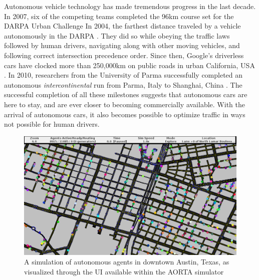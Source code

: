 \documentclass[letterpaper, 10 pt, conference]{ieeeconf}  %
\begin{document}
Autonomous vehicle technology has made tremendous progress in the last decade.
In 2007, six of the competing teams completed the 96km course set for the DARPA
Urban Challenge In 2004, the farthest distance traveled by a vehicle
autonomously in the DARPA \cite{spectrumUrbanChallenge2007}. They did so while
obeying the traffic laws followed by human drivers, navigating along with other
moving vehicles, and following correct intersection precedence order. Since
then, Google's driverless cars have clocked more than 250,000km on public roads
in urban California, USA \cite{tedThrun2011}. In 2010, researchers from the
University of Parma successfully completed an autonomous
\textit{intercontinental} run from Parma, Italy to Shanghai, China
\cite{cnnVislab2010}. The successful completion of all these milestones
suggests that autonomous cars are here to stay, and are ever closer to becoming
commercially available. With the arrival of autonomous cars, it also becomes
possible to optimize traffic in ways not possible for human drivers. 


\begin{figure}[t]
  \centering \includegraphics[width=\linewidth]{downtown_atx.png}
  \caption{A simulation of autonomous agents in downtown Austin, Texas, as visualized through the UI available within the AORTA simulator}
  \label{fig:ui_screenshot}
  \vspace{-15pt}
\end{figure}
\end{document}
